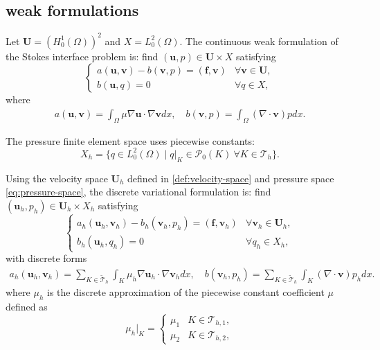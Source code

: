 \documentclass[a4paper,11pt,fleqn]{article}
\numberwithin{equation}{section}
\begin{document}
\subsection{weak formulations}\label{subsec:WF}
Let $\boldsymbol{U} = (H^1_0(\Omega))^2$ and $X = L^2_0(\Omega)$. 
The continuous weak formulation of the Stokes interface problem is: 
find $(\boldsymbol{u},p) \in \boldsymbol{U} \times X$ satisfying
\begin{equation}\label{eq:stweak}
	\begin{cases}
		a(\boldsymbol{u}, \boldsymbol{v}) - b(\boldsymbol{v}, p) = (\bm{f},\boldsymbol{v}) & \forall \boldsymbol{v} \in \boldsymbol{U}, \\
		b(\boldsymbol{u}, q) = 0 & \forall q \in X,
	\end{cases}
\end{equation}
where
\begin{align*}
	a(\boldsymbol{u}, \boldsymbol{v}) = \int_{\Omega} \mu \nabla \boldsymbol{u} \cdot \nabla \boldsymbol{v}  dx, \quad
	b(\boldsymbol{v}, p) = \int_{\Omega} (\nabla \cdot \boldsymbol{v}) p  dx.
\end{align*}

The pressure finite element space uses piecewise constants:
\begin{equation}\label{eq:pressure-space}
	X_h = \{ q \in L^2_0(\Omega) \mid q|_K \in \mathcal{P}_0(K) \ \forall K \in \mathcal{T}_h \}.
\end{equation}

Using the velocity space $\boldsymbol{U}_h$ defined in \eqref{def:velocity-space} and pressure space \eqref{eq:pressure-space}, 
the discrete variational formulation is: find $(\boldsymbol{u}_h, p_h) \in \boldsymbol{U}_h \times X_h$ satisfying
\begin{equation}\label{eq:stweak-discrete}
	\begin{cases}
		a_h(\boldsymbol{u}_h, \boldsymbol{v}_h) - b_h(\boldsymbol{v}_h, p_h) = (\bm{f},\boldsymbol{v}_h) & \forall \boldsymbol{v}_h \in \boldsymbol{U}_h, \\
		b_h(\boldsymbol{u}_h, q_h) = 0 & \forall q_h \in X_h,
	\end{cases}
\end{equation}
with discrete forms
\begin{align*}
	a_h(\boldsymbol{u}_h, \boldsymbol{v}_h) = \sum_{K \in \widetilde{\mathcal{T}}_h} \int_K \mu_h \nabla \boldsymbol{u}_h \cdot \nabla \boldsymbol{v}_h  dx,\quad
	b(\boldsymbol{v}_h, p_h) = \sum_{K \in \widetilde{\mathcal{T}}_h}\int_{K} (\nabla \cdot \boldsymbol{v}) p_h  dx.
\end{align*}
where $\mu_h$ is the discrete approximation of the piecewise constant coefficient $\mu$ defined as
\[
\mu_h|_{K} =
\begin{cases}
	\mu_1 & K \in \mathcal{T}_{h,1}, \\
	\mu_2 & K \in \mathcal{T}_{h,2},
\end{cases}
\]
\end{document}
